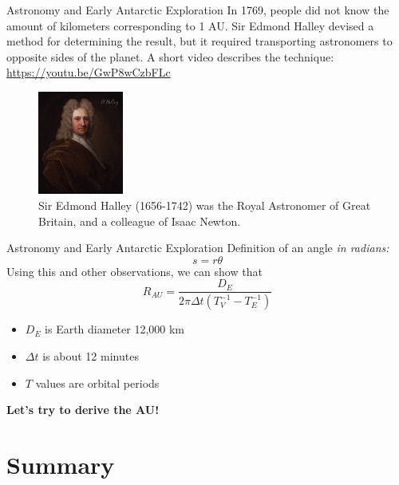 \documentclass{beamer}
\begin{document}
\begin{frame}{Astronomy and Early Antarctic Exploration}
\small
In 1769, people did not know the amount of kilometers corresponding to 1 AU.  Sir Edmond Halley devised a method for determining the result, but it required transporting astronomers to opposite sides of the planet.  A short video describes the technique: \\ \vspace{0.5cm}
\url{https://youtu.be/GwP8wCzbFLc}
\begin{figure}
\centering
\includegraphics[width=0.25\textwidth]{figures/Edmond_Halley_072.jpg}
\caption{\label{fig:halley} Sir Edmond Halley (1656-1742) was the Royal Astronomer of Great Britain, and a colleague of Isaac Newton.}
\end{figure}
\end{frame}

\begin{frame}{Astronomy and Early Antarctic Exploration}
Definition of an angle \textit{in radians:}
\begin{equation}
s = r \theta
\end{equation}
Using this and other observations, we can show that
\begin{equation}
R_{AU} = \frac{D_E}{2\pi\Delta t \left( T_V^{-1} - T_E^{-1} \right)}
\end{equation}
\begin{itemize}
\item $D_E$ is Earth diameter 12,000 km
\item $\Delta t$ is about 12 minutes
\item $T$ values are orbital periods
\end{itemize}
\textbf{Let's try to derive the AU!}
\end{frame}

\section{Summary}
\end{document}
